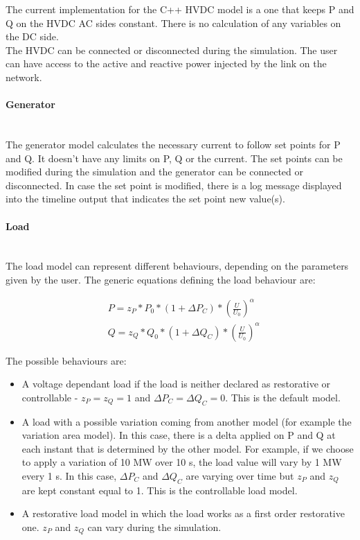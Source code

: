 \documentclass[a4paper, 12pt]{report}
\begin{document}
The current implementation for the C++ HVDC model is a one that keeps P and Q on the HVDC AC sides constant. There is no calculation of any variables on the DC side. \\
The HVDC can be connected or disconnected during the simulation. The user can have access to the active and reactive power injected by the link on the network. \\

\paragraph{Generator}
~~\\

The generator model calculates the necessary current to follow set points for P and Q. It doesn't have any limits on P, Q or the current. The set points can be modified during the simulation and the generator can be connected or disconnected. In case the set point is modified, there is a log message displayed into the timeline output that indicates the set point new value(s). \\

\paragraph{Load}
~~\\

The load model can represent different behaviours, depending on the parameters given by the user. The generic equations defining the load behaviour are:

\begin{equation}
\begin{aligned}
& P = z_{P} * P_{0} * (1 + \Delta P_{C}) * (\frac{U}{U_{0}})^\alpha \\
& Q = z_{Q} * Q_{0} * (1 + \Delta Q_{C}) * (\frac{U}{U_{0}})^\alpha
\end{aligned}
\label{Load model}
\end{equation}

The possible behaviours are:
\begin{itemize}
\item A voltage dependant load if the load is neither declared as restorative or controllable - $z_{P} = z_{Q} = 1$ and $\Delta P_{C} = \Delta Q_{C} = 0 $. This is the default model.
\item A load with a possible variation coming from another model (for example the variation area model). In this case, there is a delta applied on P and Q at each instant that is determined by the other model. For example, if we choose to apply a variation of 10 MW over 10 s, the load value will vary by 1 MW every 1 s. In this case, $\Delta P_{C}$ and $\Delta Q_{C}$ are varying over time but $z_{P}$ and $z_{Q}$ are kept constant equal to 1. This is the controllable load model.
\item A restorative load model in which the load works as a first order restorative one. $z_{P}$ and $z_{Q}$ can vary during the simulation.
\end{itemize}
\end{document}
